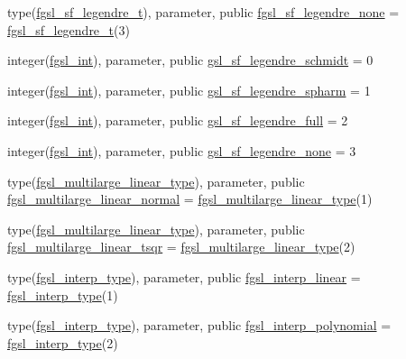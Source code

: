 \begin{DoxyCompactItemize}
\item 
type(\hyperlink{structfgsl_1_1fgsl__sf__legendre__t}{fgsl\+\_\+sf\+\_\+legendre\+\_\+t}), parameter, public \hyperlink{namespacefgsl_ab780f015ad3062497e33c2629f13e021}{fgsl\+\_\+sf\+\_\+legendre\+\_\+none} = \hyperlink{structfgsl_1_1fgsl__sf__legendre__t}{fgsl\+\_\+sf\+\_\+legendre\+\_\+t}(3)
\item 
integer(\hyperlink{namespacefgsl_a222deda1d7a0c0e845ce4a683318efeb}{fgsl\+\_\+int}), parameter, public \hyperlink{namespacefgsl_a2621c92cbb7a2c08eaaaa7f9cd3a32ff}{gsl\+\_\+sf\+\_\+legendre\+\_\+schmidt} = 0
\item 
integer(\hyperlink{namespacefgsl_a222deda1d7a0c0e845ce4a683318efeb}{fgsl\+\_\+int}), parameter, public \hyperlink{namespacefgsl_a16ccc1e4e6aa459e435bad49a3c88e62}{gsl\+\_\+sf\+\_\+legendre\+\_\+spharm} = 1
\item 
integer(\hyperlink{namespacefgsl_a222deda1d7a0c0e845ce4a683318efeb}{fgsl\+\_\+int}), parameter, public \hyperlink{namespacefgsl_a635161b3c6f02e2821807e5acb512573}{gsl\+\_\+sf\+\_\+legendre\+\_\+full} = 2
\item 
integer(\hyperlink{namespacefgsl_a222deda1d7a0c0e845ce4a683318efeb}{fgsl\+\_\+int}), parameter, public \hyperlink{namespacefgsl_a09eadb78c5f3fc4662d23ac52aaa33b3}{gsl\+\_\+sf\+\_\+legendre\+\_\+none} = 3
\item 
type(\hyperlink{structfgsl_1_1fgsl__multilarge__linear__type}{fgsl\+\_\+multilarge\+\_\+linear\+\_\+type}), parameter, public \hyperlink{namespacefgsl_ae183ddeba0c0b5b8bc4ca6508e63519b}{fgsl\+\_\+multilarge\+\_\+linear\+\_\+normal} = \hyperlink{structfgsl_1_1fgsl__multilarge__linear__type}{fgsl\+\_\+multilarge\+\_\+linear\+\_\+type}(1)
\item 
type(\hyperlink{structfgsl_1_1fgsl__multilarge__linear__type}{fgsl\+\_\+multilarge\+\_\+linear\+\_\+type}), parameter, public \hyperlink{namespacefgsl_a15f9b6d29fecabfb8a34b6d5ea69a87b}{fgsl\+\_\+multilarge\+\_\+linear\+\_\+tsqr} = \hyperlink{structfgsl_1_1fgsl__multilarge__linear__type}{fgsl\+\_\+multilarge\+\_\+linear\+\_\+type}(2)
\item 
type(\hyperlink{structfgsl_1_1fgsl__interp__type}{fgsl\+\_\+interp\+\_\+type}), parameter, public \hyperlink{namespacefgsl_a56a303cdb0b7046c3d8bfd1ebbf77bbc}{fgsl\+\_\+interp\+\_\+linear} = \hyperlink{structfgsl_1_1fgsl__interp__type}{fgsl\+\_\+interp\+\_\+type}(1)
\item 
type(\hyperlink{structfgsl_1_1fgsl__interp__type}{fgsl\+\_\+interp\+\_\+type}), parameter, public \hyperlink{namespacefgsl_aedbdc4347cb86cafe5bd0a2da8e38648}{fgsl\+\_\+interp\+\_\+polynomial} = \hyperlink{structfgsl_1_1fgsl__interp__type}{fgsl\+\_\+interp\+\_\+type}(2)

\end{DoxyCompactItemize}
